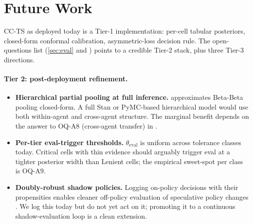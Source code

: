\section{Future Work}
\label{sec:future}

CC-TS as deployed today is a Tier-1 implementation: per-cell tabular
posteriors, closed-form conformal calibration, asymmetric-loss decision
rule. The open-questions list (\cref{sec:eval} and \cite{blackrim_moa1c})
points to a credible Tier-2 stack, plus three Tier-3 directions.

\paragraph{Tier 2: post-deployment refinement.}
\begin{itemize}[leftmargin=*]
  \item \textbf{Hierarchical partial pooling at full inference.}
         approximates Beta-Beta pooling closed-form. A
        full Stan or PyMC-based hierarchical model
        \cite{carpenter2017stan,gelman2013bayesian} would use both
        within-agent and cross-agent structure. The marginal benefit
        depends on the answer to OQ-A8 (cross-agent transfer) in
        \cite{blackrim_moa1c}.
  \item \textbf{Per-tier eval-trigger thresholds.}
        $\theta_{\mathrm{eval}}$ is uniform across tolerance classes today.
        Critical cells with thin evidence should arguably trigger eval at
        a tighter posterior width than Lenient cells; the empirical
        sweet-spot per class is OQ-A9.
  \item \textbf{Doubly-robust shadow policies.}
        Logging on-policy decisions with their propensities enables
        cleaner off-policy evaluation of speculative policy changes
        \cite{thomas2016data,jiang2016doubly}. We log this today but do not
        yet act on it; promoting it to a continuous shadow-evaluation loop
        is a clean extension.
\end{itemize}

